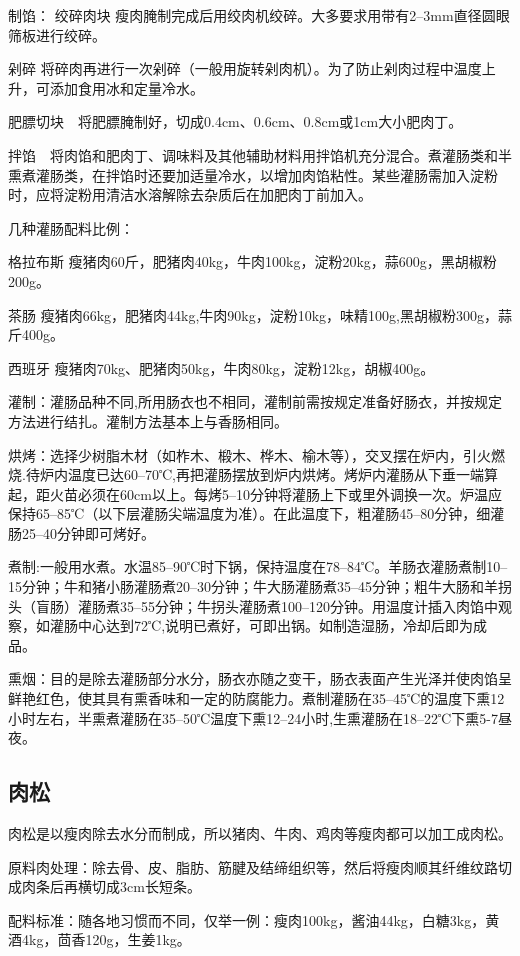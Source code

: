 \documentclass{ctexbook}
\begin{document}
制馅：
绞碎肉块 瘦肉腌制完成后用绞肉机绞碎。大多要求用带有2--3mm直径圆眼筛板进行绞碎。

剁碎 将碎肉再进行一次剁碎（一般用旋转剁肉机）。为了防止剁肉过程中温度上升，可添加食用冰和定量冷水。

肥膘切块　将肥膘腌制好，切成0.4cm、0.6cm、0.8cm或1cm大小肥肉丁。

拌馅　将肉馅和肥肉丁、调味料及其他辅助材料用拌馅机充分混合。煮灌肠类和半熏煮灌肠类，在拌馅时还要加适量冷水，以增加肉馅粘性。某些灌肠需加入淀粉时，应将淀粉用清洁水溶解除去杂质后在加肥肉丁前加入。

几种灌肠配料比例：

格拉布斯 瘦猪肉60斤，肥猪肉40kg，牛肉100kg，淀粉20kg，蒜600g，黑胡椒粉200g。

茶肠 瘦猪肉66kg，肥猪肉44kg,牛肉90kg，淀粉10kg，味精100g,黑胡椒粉300g，蒜斤400g。

西班牙 瘦猪肉70kg、肥猪肉50kg，牛肉80kg，淀粉12kg，胡椒400g。

灌制：灌肠品种不同,所用肠衣也不相同，灌制前需按规定准备好肠衣，并按规定方法进行结扎。灌制方法基本上与香肠相同。

烘烤：选择少树脂木材（如柞木、椴木、桦木、榆木等），交叉摆在炉内，引火燃烧.待炉内温度已达60--70℃,再把灌肠摆放到炉内烘烤。烤炉内灌肠从下垂一端算起，距火苗必须在60cm以上。每烤5--10分钟将灌肠上下或里外调换一次。炉温应保持65--85℃（以下层灌肠尖端温度为准）。在此温度下，粗灌肠45--80分钟，细灌肠25--40分钟即可烤好。

煮制:一般用水煮。水温85--90℃时下锅，保持温度在78--84℃。羊肠衣灌肠煮制10--15分钟；牛和猪小肠灌肠煮20--30分钟；牛大肠灌肠煮35--45分钟；粗牛大肠和羊拐头（盲肠）灌肠煮35--55分钟；牛拐头灌肠煮100--120分钟。用温度计插入肉馅中观察，如灌肠中心达到72℃,说明已煮好，可即出锅。如制造湿肠，冷却后即为成品。

熏烟：目的是除去灌肠部分水分，肠衣亦随之变干，肠衣表面产生光泽并使肉馅呈鲜艳红色，使其具有熏香味和一定的防腐能力。煮制灌肠在35--45℃的温度下熏12小时左右，半熏煮灌肠在35--50℃温度下熏12--24小时,生熏灌肠在18--22℃下熏5-7昼夜。
\subsection{肉松}
肉松是以瘦肉除去水分而制成，所以猪肉、牛肉、鸡肉等瘦肉都可以加工成肉松。

原料肉处理：除去骨、皮、脂肪、筋腱及结缔组织等，然后将瘦肉顺其纤维纹路切成肉条后再横切成3cm长短条。

配料标准：随各地习惯而不同，仅举一例：瘦肉100kg，酱油44kg，白糖3kg，黄酒4kg，茴香120g，生姜1kg。
\end{document}
